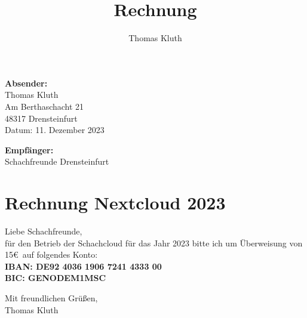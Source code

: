 \documentclass[12pt, a4paper, ngerman, DIV=14] {scrartcl}
\author{Thomas Kluth}
\title{Rechnung}
\begin{document}
\begin{flushright}
	\textbf{Absender:}\\
	Thomas Kluth\\
	Am Berthaschacht 21\\
	48317 Drensteinfurt\\
	Datum: 11. Dezember 2023 %
\end{flushright}
\begin{flushleft}
	\textbf{Empfänger:}\\
	Schachfreunde Drensteinfurt\\
	\end{flushleft}
\section*{Rechnung Nextcloud  2023 }

Liebe Schachfreunde, \\

für den Betrieb der Schachcloud für das Jahr 2023 bitte ich um Überweisung von 15\;\euro\ auf folgendes Konto:\\
\textbf{IBAN: DE92 4036 1906 7241 4333 00\\
BIC: GENODEM1MSC}

%
%
%

Mit freundlichen Grüßen, \\
Thomas Kluth
\end{document}

